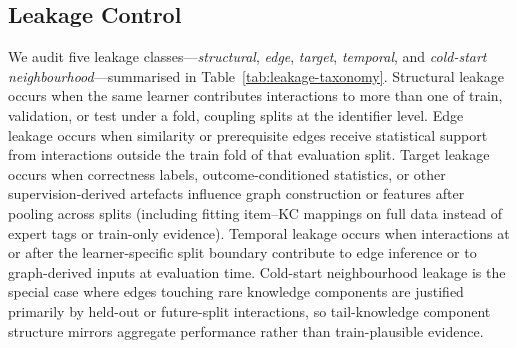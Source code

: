 \documentclass[runningheads]{llncs}
\newcommand{\KC}{knowledge component}
\newcommand{\KCs}{knowledge components}
\begin{document}
\subsection{Leakage Control}
\label{sec:leakage}
We audit five leakage classes---\emph{structural}, \emph{edge}, \emph{target},
\emph{temporal}, and \emph{cold-start neighbourhood}---summarised in
Table~\ref{tab:leakage-taxonomy}. Structural leakage occurs when the same
learner contributes interactions to more than one of train, validation, or test under a fold, coupling splits at the identifier level. Edge leakage occurs when similarity or
prerequisite edges receive statistical support from interactions
outside the train fold of that evaluation split. Target leakage occurs
when correctness labels, outcome-conditioned statistics, or other
supervision-derived artefacts influence graph construction or features
after pooling across splits (including fitting item--KC mappings on
full data instead of expert tags or train-only evidence). Temporal
leakage occurs when interactions at or after the learner-specific split
boundary contribute to edge inference or to graph-derived inputs at
evaluation time. Cold-start neighbourhood leakage is the special case
where edges touching rare \KCs{} are justified primarily by held-out or
future-split interactions, so tail-\KC{} structure mirrors aggregate
performance rather than train-plausible evidence.
\end{document}
